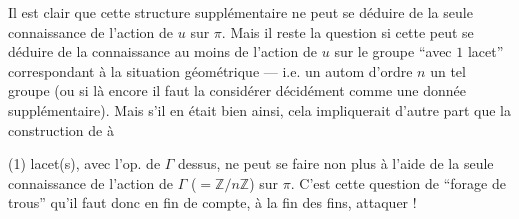 Il est clair que cette structure supplémentaire ne peut se déduire
de la seule connaissance de l'action de \(u\) sur \(\pi\).
Mais il reste la question si cette 
peut se déduire de la connaissance au moins de l'action
 de \(u\) sur le groupe
``avec \(1\) lacet'' correspondant à la situation géométrique
--- i.e. un autom 
 d'ordre \(n\)  un tel groupe
(ou si là encore il faut la considérer décidément comme une donnée
supplémentaire).
Mais s'il en était bien ainsi, cela impliquerait d'autre part que la
construction de  à



(1) lacet(s), avec l'op. de \(\Gamma\) dessus, ne peut se faire non
plus à l'aide de la seule 
connaissance de l'action de \(\Gamma\) (\(=\mathbb Z/n\mathbb Z\))
sur \(\pi\).
C'est cette question de ``forage de trous'' qu'il faut donc en fin de
compte, à la fin des fins, attaquer !

